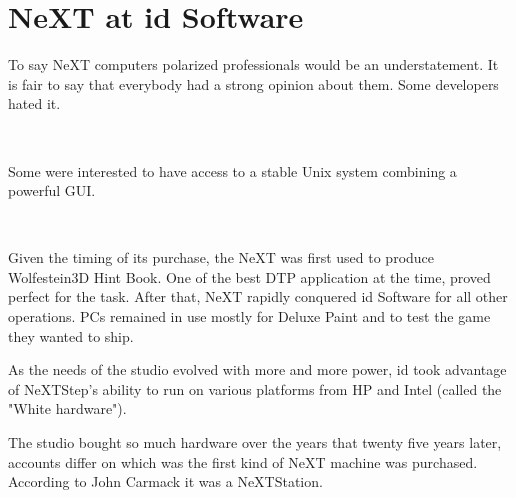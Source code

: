 \section{NeXT at id Software}
To say NeXT computers polarized professionals would be an understatement. It is fair to say that everybody had a strong opinion about them. Some developers hated it.\\
\par
{}\\
\par
Some were interested to have access to a stable Unix system combining a powerful GUI.\\
\par
{}
\\
\par
Given the timing of its purchase, the NeXT was first used to produce Wolfestein3D Hint Book. One of the best DTP application at the time,  proved perfect for the task. After that, NeXT rapidly conquered id Software for all other operations. PCs remained in use mostly for Deluxe Paint and to test the game they wanted to ship.\\
\par
As the needs of the studio evolved with more and more power, id took advantage of NeXTStep's ability to run on various platforms from HP and Intel (called the "White hardware").






The studio bought so much hardware over the years that twenty five years later, accounts differ on which was the first kind of NeXT machine was purchased. According to John Carmack it was a NeXTStation.\\
\par
\vspace{2mm}

